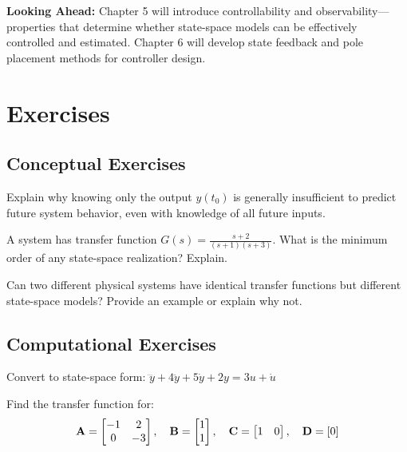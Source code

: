 \textbf{Looking Ahead:} Chapter 5 will introduce controllability and observability---properties that determine whether state-space models can be effectively controlled and estimated. Chapter 6 will develop state feedback and pole placement methods for controller design.

\newpage
\section{Exercises}
\label{sec:exercises}

\subsection*{Conceptual Exercises}

\begin{exercise}
Explain why knowing only the output $y(t_0)$ is generally insufficient to predict future system behavior, even with knowledge of all future inputs.
\end{exercise}

\begin{exercise}
A system has transfer function $G(s) = \frac{s+2}{(s+1)(s+3)}$. What is the minimum order of any state-space realization? Explain.
\end{exercise}

\begin{exercise}
Can two different physical systems have identical transfer functions but different state-space models? Provide an example or explain why not.
\end{exercise}

\subsection*{Computational Exercises}

\begin{exercise}
Convert to state-space form: $\dddot{y} + 4\ddot{y} + 5\dot{y} + 2y = 3u + \dot{u}$
\end{exercise}

\begin{exercise}
Find the transfer function for:
\begin{equation*}
    \mathbf{A} = \begin{bmatrix} -1 & 2 \\ 0 & -3 \end{bmatrix}, \quad
    \mathbf{B} = \begin{bmatrix} 1 \\ 1 \end{bmatrix}, \quad
    \mathbf{C} = \begin{bmatrix} 1 & 0 \end{bmatrix}, \quad
    \mathbf{D} = [0]
\end{equation*}
\end{exercise}

